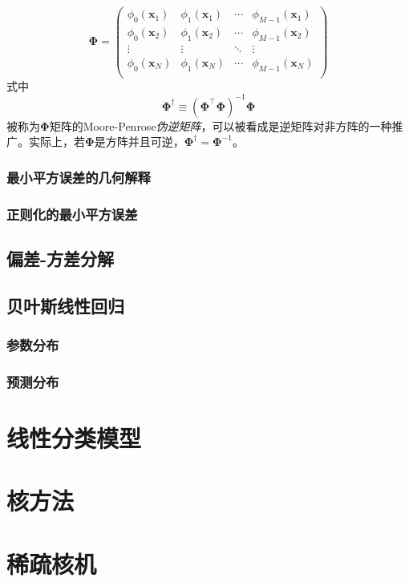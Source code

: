 \documentclass[11pt]{ctexbook}
\begin{document}
\begin{equation}
	\bm\Phi = \left(
	\begin{matrix}
		\phi_0(\bm x_1) & \phi_1(\bm x_1) &\cdots & \phi_{M-1}(\bm x_1) \\
		\phi_0(\bm x_2) & \phi_1(\bm x_2) &\cdots & \phi_{M-1}(\bm x_2) \\
		\vdots & \vdots & \ddots & \vdots \\
		\phi_0(\bm x_N) & \phi_1(\bm x_N) &\cdots & \phi_{M-1}(\bm x_N) \\
	\end{matrix}
	\right)
\end{equation}
式中
\begin{equation}
	\bm\Phi^\dag \equiv (\bm\Phi^\top\bm\Phi)^{-1}\bm\Phi
\end{equation}
被称为$\bm\Phi$矩阵的Moore-Penrose\emph{伪逆矩阵}，可以被看成是逆矩阵对非方阵的一种推广。实际上，若$\bm\Phi$是方阵并且可逆，$\bm\Phi^\dag=\bm\Phi^{-1}$。
\subsection{最小平方误差的几何解释}
\subsection{正则化的最小平方误差}
\section{偏差-方差分解}
\section{贝叶斯线性回归}
\subsection{参数分布}
\subsection{预测分布}

\chapter{线性分类模型}

\chapter{核方法}

\chapter{稀疏核机}
\end{document}
